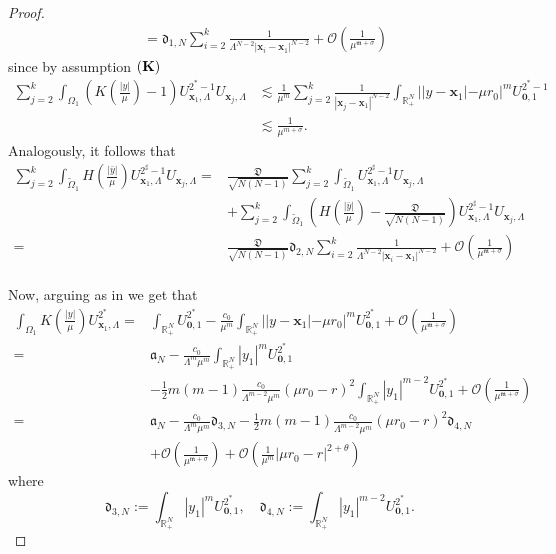 \documentclass[11pt,a4paper]{amsart}
\begin{document}
\begin{proof}
$$\begin{aligned}
&=\mathfrak d_{1, N}\sum_{i=2}^k\frac{1}{\Lambda^{N-2}|\mathbf{x}_i-\mathbf{x}_1|^{N-2}}+\mathcal O\left(\frac{1}{\mu^{\mathfrak m+\sigma}}\right)\end{aligned}$$ since by assumption $(\bf K)$
$$\begin{aligned}\sum_{j=2}^k\int_{\Omega_1}\left(K\left(\frac{|y|}{\mu}\right)-1\right)U_{\mathbf{x}_1,\Lambda}^{2^*-1}U_{\mathbf{x}_j,\Lambda}&\lesssim \frac{1}{\mu^m}\sum_{j=2}^k\frac{1}{|\mathbf{x}_j-\mathbf{x}_1|^{N-2}}\int_{\mathbb R^N_+}||y-\mathbf{x}_1|-\mu r_0|^m U_{\mathbf{0},1}^{2^*-1}\\
&\lesssim \frac{1}{\mu^{m+\sigma}}.\end{aligned}$$ Analogously, it follows that
$$\begin{aligned}\sum_{j=2}^k\int_{\widetilde\Omega_1}H\left(\frac{|\bar y|}{\mu}\right)U_{\mathbf{x}_1,\Lambda}^{2^\sharp-1}U_{\mathbf{x}_j,\Lambda}=&\frac{\mathfrak D}{\sqrt{N(N-1)}}\sum_{j=2}^k\int_{\widetilde\Omega_1}U_{\mathbf{x}_1,\Lambda}^{2^\sharp-1}U_{\mathbf{x}_j,\Lambda}\\&+\sum_{j=2}^k\int_{\widetilde\Omega_1}\left(H\left(\frac{|\bar y|}{\mu}\right)-\frac{\mathfrak D}{\sqrt{N(N-1)}}\right)U_{\mathbf{x}_1,\Lambda}^{2^\sharp-1}U_{\mathbf{x}_j,\Lambda}\\
=&\frac{\mathfrak D}{\sqrt{N(N-1)}}\mathfrak d_{2, N}\sum_{i=2}^k\frac{1}{\Lambda^{N-2}|\mathbf{x}_i-\mathbf{x}_1|^{N-2}}+\mathcal O\left(\frac{1}{\mu^{\mathfrak m+\sigma}}\right)\\
\end{aligned}$$

Now, arguing as in \cite{WeiYan_2010a} we get that
$$
  \begin{aligned}
\int_{\Omega_1}K\left(\frac{|y|}{\mu}\right)U_{\mathbf{x}_1,\Lambda}^{2^*}=& \int_{\mathbb R^N_+} U_{\mathbf{0},1}^{2^*}-\frac{c_0}{\mu^m}\int_{\mathbb R^N_+}||y-\mathbf{x}_1|-\mu r_0|^mU_{\mathbf{0},1}^{2^*}+\mathcal O\left(\frac{1}{\mu^{\mathfrak m+\sigma}}\right)\\
=&\mathfrak a_N-\frac{c_0}{\Lambda^m\mu^m}\int_{\mathbb R^N_+}|y_1|^mU_{\mathbf{0},1}^{2^*}\\&-\frac 12 m(m-1)\frac{c_0}{\Lambda^{m-2}\mu^m}(\mu r_0-r)^2 \int_{\mathbb R^N_+}|y_1|^{m-2}U_{\mathbf{0},1}^{2^*}+\mathcal O\left(\frac{1}{\mu^{\mathfrak m+\sigma}}\right)\\
=&\mathfrak a_N-\frac{c_0}{\Lambda^m\mu^m}\mathfrak d_{3, N}-\frac 12 m(m-1)\frac{c_0}{\Lambda^{m-2}\mu^m} (\mu r_0-r)^2\mathfrak d_{4, N}\\
&+\mathcal O\left(\frac{1}{\mu^{\mathfrak m+\sigma}}\right) +\mathcal O\left(\frac{1}{\mu^{m}}|\mu r_0-r|^{2+\theta}\right)  \end{aligned}
$$
where
$$\mathfrak d_{3, N}:=\int_{\mathbb R^N_+}|y_1|^mU_{\mathbf{0},1}^{2^*},\quad \mathfrak d_{4, N}:= \int_{\mathbb R^N_+}|y_1|^{m-2}U_{\mathbf{0},1}^{2^*}.$$


\end{proof}
\end{document}
